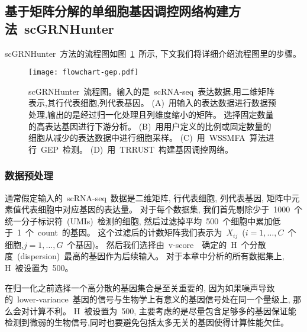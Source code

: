 \subsection{基于矩阵分解的单细胞基因调控网络构建方法~scGRNHunter}

scGRNHunter~方法的流程图如图~\ref{fig:gep-flowchart}~所示, 下文我们将详细介绍流程图里的步骤。
\begin{figure}[!htbp]
    \centering
    \texttt{[image: flowchart-gep.pdf]}
    \caption{
        scGRNHunter~流程图。输入的是~scRNA-seq~表达数据,用二维矩阵表示,其行代表细胞,列代表基因。
        (A)~用输入的表达数据进行数据预处理,输出的是经过归一化处理且列维度缩小的矩阵。
        选择固定数量的高表达基因进行下游分析。
        (B)~用用户定义的比例或固定数量的细胞从减少的表达数据中进行细胞采样。
        (C)~用~WSSMFA~算法进行~GEP~检测。
        (D)~用~TRRUST~构建基因调控网络。
    }
    \label{fig:gep-flowchart}
\end{figure}

\subsubsection{数据预处理}
通常假定输入的~scRNA-seq~数据是二维矩阵, 行代表细胞, 列代表基因, 矩阵中元素值代表细胞中对应基因的表达量。
对于每个数据集, 我们首先剔除少于~1000~个统一分子标识符~(UMIs)~检测的细胞,
然后过滤掉平均~500~个细胞中累加低于~1~个~count~的基因。
这个过滤后的计数矩阵我们表示为~$X_{ij}$~($i=1,\ldots,C$~个细胞,$j=1,\ldots,G$~个基因)。
然后我们选择由~v-score~\cite{klein2015droplet}~确定的~H~个分散度~(dispersion)~最高的基因作为后续输入。
对于本章中分析的所有数据集上, H~被设置为~500。

在归一化之前选择一个高分散的基因集合是至关重要的, 
因为如果噪声导致的~lower-variance~基因的信号与生物学上有意义的基因信号处在同一个量级上, 那么会对计算不利。 
H~被设置为~500, 主要考虑的是尽量包含足够多的基因保证能检测到微弱的生物信号,同时也要避免包括太多无关的基因使得计算性能欠佳。

